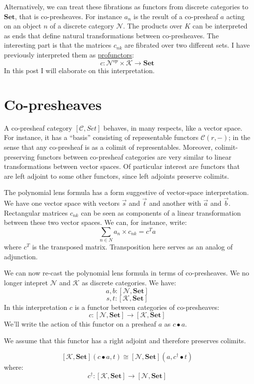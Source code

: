 \documentclass[11pt]{amsart}
\newcommand{\cat}[1]{\mathcal{#1}}%
\newcommand{\Cat}[1]{\mathbf{#1}}%
\newcommand{\Set}{\Cat{Set}}
\begin{document}
Alternatively, we can treat these fibrations as functors from discrete categories to $\Set$, that is co-presheaves. For instance $a_n$ is the result of a co-presheaf $a$ acting on an object $n$ of a discrete category $\cat N$. The products over $K$ can be interpreted as ends that define natural transformations between co-presheaves. The interesting part is that the matrices $c_{n k}$ are fibrated over two different sets. I have previously interpreted them as \href{https://bartoszmilewski.com/2021/12/10/profunctor-representation-of-a-polynomial-lens/}{profunctors}:
\[ c \colon \cat N^{op} \times \cat K \to \Set \]
In this post I will elaborate on this interpretation.

\section{Co-presheaves}

A co-presheaf category  $[\cat C, Set ]$ behaves, in many respects, like a vector space. For instance, it has a ``basis'' consisting of representable functors $\cat C (r, -)$; in the sense that any co-presheaf is as a colimit of representables. Moreover, colimit-preserving functors between co-presheaf categories are very similar to linear transformations between vector spaces. Of particular interest are functors that are left adjoint to some other functors, since left adjoints preserve colimits. 

The polynomial lens formula has a form suggestive of vector-space interpretation. We have one vector space with vectors $\vec{s}$ and $\vec{t}$ and another with $\vec{a}$ and $\vec{b}$. Rectangular matrices $c_{n k}$ can be seen as components of a linear transformation between these two vector spaces. We can, for instance, write:
\[  \sum_{n \in N} a_n \times c_{n k} = c^T a \]
where $c^T$ is the transposed matrix. Transposition here serves as an analog of adjunction. 

We can now re-cast the polynomial lens formula in terms of co-presheaves. We no longer intepret $\cat N$ and $\cat K$ as discrete categories. We have:
\[a, b \colon [\cat N, \Set] \]
\[ s, t \colon [\cat K, \Set] \]
In this interpretation $c$ is a functor between categories of co-presheaves:
\[ c \colon [\cat N, \Set] \to [\cat K, \Set] \]
We'll write the action of this functor on a presheaf $a$ as $c \bullet a$.

We assume that this functor has a right adjoint and therefore preserves colimits. 

\[ [\cat K, \Set] (c \bullet a, t) \cong [\cat N, \Set] (a, c^{\dagger} \bullet t) \]
where:
\[ c^{\dagger} \colon [\cat K, \Set] \to [\cat N, \Set] \]
\end{document}
